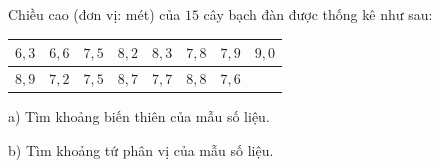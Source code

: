 \begin{ex}
Chiều cao (đơn vị: mét) của $15$ cây bạch đàn được thống kê như sau:
\begin{center}
\begin{tabular}{|c|c|c|c|c|c|c|c|}\hline
$6{,}3$ & $6{,}6$ & $7{,}5$ & $8{,}2$ & $8{,}3$ & $7{,}8$ & $7{,}9$ & $9{,}0$\\\hline
$8{,}9$ & $7{,}2$ & $7{,}5$ & $8{,}7$ & $7{,}7$ & $8{,}8$ & $7{,}6$ & \\\hline
\end{tabular}
\end{center}
a) Tìm khoảng biến thiên của mẫu số liệu.

b) Tìm khoảng tứ phân vị của mẫu số liệu.
\end{ex}
